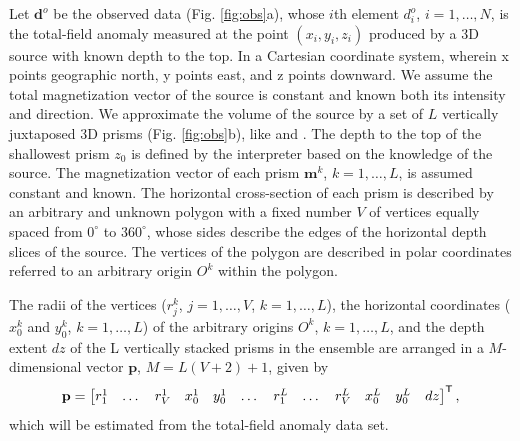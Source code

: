 \documentclass[extra,mreferee]{gji}
\begin{document}
Let $\mathbf{d}^o$ be the observed data (Fig. \ref{fig:obs}a), whose $i$th element $d^o_i$, $i = 1, \dots, N$, is the total-field anomaly measured at the point $(x_i, y_i, z_i)$ produced by a 3D source with known depth to the top. In a Cartesian coordinate system, wherein x points geographic north, y points east, and z points downward. We assume the total magnetization vector of the source is constant and known both its intensity and direction. We approximate the volume of the source by a set of $L$ vertically juxtaposed 3D prisms (Fig. \ref{fig:obs}b), like \cite{OliveiraJrVanderleiC.2011Sgeu} and \cite{OliveiraVanderleiC.20133rgg}. The depth to the top of the shallowest prism $z_0$ is defined by the interpreter based on the knowledge of the source. The magnetization vector of each prism $\mathbf{m}^k$, $k=1,\dots ,L$, is assumed constant and known. The horizontal cross-section of each prism is described by an arbitrary and unknown polygon with a fixed number $V$ of vertices equally spaced from $0^{\circ}$ to $360^{\circ}$, whose sides describe the edges of the horizontal depth slices of the source. The vertices of the polygon are described in polar coordinates referred to an arbitrary origin $O^k$ within the polygon. 

The radii of the vertices ($r^k_j$, $j=1,\dots , V$, $k=1,\dots ,L$), the horizontal coordinates ($x_0^k$ and $y_0^k$, $k=1,\dots ,L$) of the arbitrary origins $O^k$, $k=1,\dots ,L$, and the depth extent $dz$ of the L vertically stacked prisms in the ensemble are arranged in a $M$-dimensional vector $\mathbf{p}$, $M = L (V + 2) + 1$, given by
\begin{equation}
    \mathbf{p} =
    \left[ \begin{array}{@{}*{12}{c}@{}}
        r_1^1 & \dots & r_V^1 & x_0^1 & y_0^1 & \dots & r_1^L & \dots & r_V^L & x_0^L & y_0^L & dz\\
    \end{array} \right]^{\mathsf{T}},
\end{equation}
which will be estimated from the total-field anomaly data set.
\end{document}
